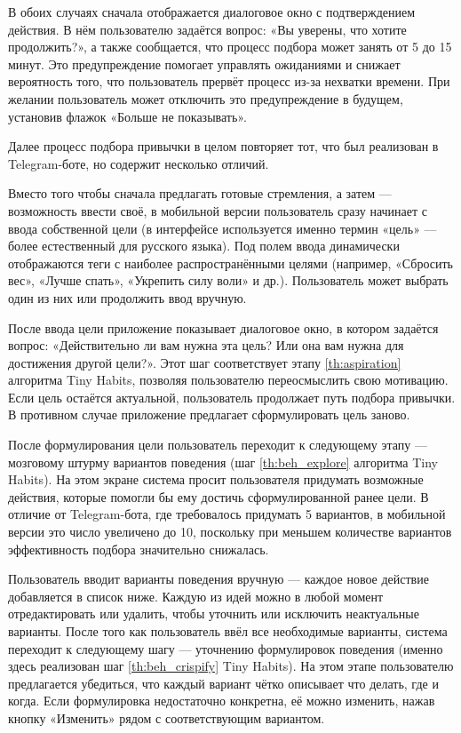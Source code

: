 \documentclass[pdflatex,sn-mathphys-num]{sn-jnl}%
\theoremstyle{thmstyleone}%
\theoremstyle{thmstyletwo}%
\theoremstyle{thmstylethree}%
\begin{document}
В обоих случаях сначала отображается диалоговое окно с подтверждением действия. В нём пользователю задаётся вопрос:
«Вы уверены, что хотите продолжить?», а также сообщается, что процесс подбора может занять от 5 до 15 минут. Это предупреждение помогает управлять ожиданиями и снижает вероятность того, что пользователь прервёт процесс из-за нехватки времени. При желании пользователь может отключить это предупреждение в будущем, установив флажок «Больше не показывать».

Далее процесс подбора привычки в целом повторяет тот, что был реализован в Telegram-боте, но содержит несколько отличий.

Вместо того чтобы сначала предлагать готовые стремления, а затем — возможность ввести своё, в мобильной версии пользователь сразу начинает с ввода собственной цели (в интерфейсе используется именно термин «цель» — более естественный для русского языка). Под полем ввода динамически отображаются теги с наиболее распространёнными целями (например, «Сбросить вес», «Лучше спать», «Укрепить силу воли» и др.). Пользователь может выбрать один из них или продолжить ввод вручную.

После ввода цели приложение показывает диалоговое окно, в котором задаётся вопрос: «Действительно ли вам нужна эта цель? Или она вам нужна для достижения другой цели?». Этот шаг соответствует этапу \ref{th:aspiration} алгоритма Tiny Habits, позволяя пользователю переосмыслить свою мотивацию. Если цель остаётся актуальной, пользователь продолжает путь подбора привычки. В противном случае приложение предлагает сформулировать цель заново.

После формулирования цели пользователь переходит к следующему этапу — мозговому штурму вариантов поведения (шаг \ref{th:beh_explore} алгоритма Tiny Habits). На этом экране система просит пользователя придумать возможные действия, которые помогли бы ему достичь сформулированной ранее цели. В отличие от Telegram-бота, где требовалось придумать 5 вариантов, в мобильной версии это число увеличено до 10, поскольку при меньшем количестве вариантов эффективность подбора значительно снижалась.

Пользователь вводит варианты поведения вручную — каждое новое действие добавляется в список ниже. Каждую из идей можно в любой момент отредактировать или удалить, чтобы уточнить или исключить неактуальные варианты. После того как пользователь ввёл все необходимые варианты, система переходит к следующему шагу — уточнению формулировок поведения (именно здесь реализован шаг \ref{th:beh_crispify} Tiny Habits). На этом этапе пользователю предлагается убедиться, что каждый вариант чётко описывает что делать, где и когда. Если формулировка недостаточно конкретна, её можно изменить, нажав кнопку «Изменить» рядом с соответствующим вариантом.
\end{document}
